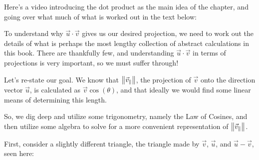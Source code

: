 \documentclass{ximera}
\begin{document}
     Here's a video introducing the dot product as the main idea of the chapter, and going over what much of what is worked out in the text below:

     \begin{center}
     \end{center}

     To understand why $\vec{u}\cdot\vec{v}$ gives us our desired projection, we need to work out the details of what is perhaps the most lengthy collection of abstract calculations in this book. There are thankfully few, and understanding $\vec{u}\cdot\vec{v}$ in terms of projections is very important, so we must suffer through!

     \begin{explanation}
      Let's re-state our goal. We know that $\left\|\vec{v}_\parallel\right\|$, the projection of $\vec{v}$ onto the direction vector $\vec{u}$, is calculated as $\vec{v}\cos(\theta)$, and that ideally we would find some linear means of determining this length. 

      So, we dig deep and utilize some trigonometry, namely the Law of Cosines, and then utilize some algebra to solve for a more convenient representation of $\left\|\vec{v}_\parallel\right\|$.

      First, consider a slightly different triangle, the triangle made by $\vec{v}$, $\vec{u}$, and $\vec{u}-\vec{v}$, seen here:

      \begin{center}
\end{center}
\end{explanation}
\end{document}
